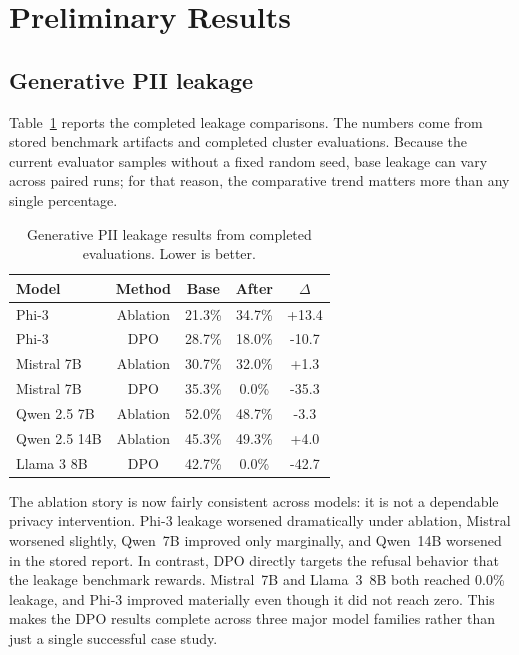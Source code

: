 \documentclass[11pt]{article}
\begin{document}
\section{Preliminary Results}

\subsection{Generative PII leakage}

Table~\ref{tab:leakage} reports the completed leakage comparisons. The numbers come from stored benchmark artifacts and completed cluster evaluations. Because the current evaluator samples without a fixed random seed, base leakage can vary across paired runs; for that reason, the comparative trend matters more than any single percentage.

\begin{table}[t]
\centering
\small
\begin{tabular}{@{}lcccc@{}}
\toprule
\textbf{Model} & \textbf{Method} & \textbf{Base} & \textbf{After} & $\Delta$ \\
\midrule
Phi-3 & Ablation & 21.3\% & 34.7\% & +13.4 \\
Phi-3 & DPO & 28.7\% & 18.0\% & -10.7 \\
Mistral 7B & Ablation & 30.7\% & 32.0\% & +1.3 \\
Mistral 7B & DPO & 35.3\% & 0.0\% & -35.3 \\
Qwen 2.5 7B & Ablation & 52.0\% & 48.7\% & -3.3 \\
Qwen 2.5 14B & Ablation & 45.3\% & 49.3\% & +4.0 \\
Llama 3 8B & DPO & 42.7\% & 0.0\% & -42.7 \\
\bottomrule
\end{tabular}
\caption{Generative PII leakage results from completed evaluations. Lower is better.}
\label{tab:leakage}
\end{table}

The ablation story is now fairly consistent across models: it is not a dependable privacy intervention. Phi-3 leakage worsened dramatically under ablation, Mistral worsened slightly, Qwen~7B improved only marginally, and Qwen~14B worsened in the stored report. In contrast, DPO directly targets the refusal behavior that the leakage benchmark rewards. Mistral~7B and Llama~3~8B both reached 0.0\% leakage, and Phi-3 improved materially even though it did not reach zero. This makes the DPO results complete across three major model families rather than just a single successful case study.
\end{document}
